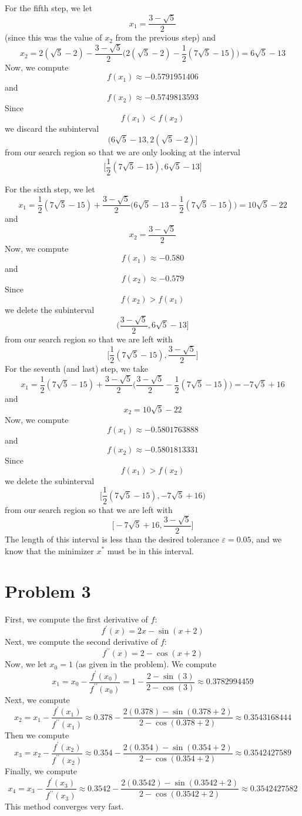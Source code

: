 \documentclass[12pt]{article}
\begin{document}
For the fifth step, we let 
\[
x_1 = \frac{3 - \sqrt{5}}{2}
\] (since this was the value of $x_2$ from the previous step) and
\[
x_2 = 2(\sqrt{5} - 2) - \frac{3 - \sqrt{5}}{2}\bigg(2(\sqrt{5} - 2) - \frac{1}{2}(7\sqrt{5} - 15)\bigg) = 6\sqrt{5} -13
\] Now, we compute 
\[
f(x_1) \approx -0.5791951406
\] and
\[
f(x_2) \approx -0.5749813593
\] Since
\[
f(x_1) < f(x_2)
\] we discard the subinterval 
\[
(6\sqrt{5} - 13, 2(\sqrt{5} - 2)]
\] from our search region so that we are only looking at the interval
\[
\bigg[\frac{1}{2}(7\sqrt{5} - 15), 6\sqrt{5} -13 \bigg]
\]

For the sixth step, we let
\[
x_1 = \frac{1}{2}(7\sqrt{5} - 15) + \frac{3 - \sqrt{5}}{2}\bigg(6\sqrt{5} -13 - \frac{1}{2}(7\sqrt{5} - 15)\bigg) = 10 \sqrt{5} - 22
\] and
\[
x_2 = \frac{3-\sqrt{5}}{2}
\] Now, we compute
\[
f(x_1) \approx -0.580
\] and
\[
f(x_2) \approx -0.579
\] Since
\[
f(x_2) > f(x_1)
\] we delete the subinterval
\[
\bigg( \frac{3-\sqrt{5}}{2}, 6\sqrt{5} - 13\bigg]
\] from our search region so that we are left with
\[
\bigg[\frac{1}{2}(7\sqrt{5} - 15), \frac{3-\sqrt{5}}{2} \bigg]
\] For the seventh (and last) step, we take
\[
x_1 = \frac{1}{2}(7\sqrt{5} - 15) + \frac{3-\sqrt{5}}{2}\bigg(\frac{3-\sqrt{5}}{2} - \frac{1}{2}(7\sqrt{5} - 15)\bigg) = -7\sqrt{5} + 16
\] and 
\[
x_2 = 10 \sqrt{5} - 22
\] Now, we compute 
\[
f(x_1) \approx -0.5801763888
\] and
\[
f(x_2) \approx -0.5801813331
\] Since 
\[
f(x_1) > f(x_2)
\] we delete the subinterval
\[
\bigg[\frac{1}{2}(7\sqrt{5} - 15),  -7\sqrt{5} + 16  \bigg)
\] from our search region so that we are left with
\[
\bigg[-7\sqrt{5} + 16, \frac{3-\sqrt{5}}{2} \bigg]
\] The length of this interval is less than the desired tolerance $\varepsilon = 0.05$, and we know that the minimizer $x^*$ must be in this interval.
\newpage
\section*{Problem 3}
First, we compute the first derivative of $f$:
\[
f^\prime(x) = 2x - \sin(x+2)
\] Next, we compute the second derivative of $f$:
\[
f^{\prime\prime}(x) = 2 - \cos(x+2)
\] Now, we let $x_0 = 1$ (as given in the problem). We compute
\[
x_1 = x_0 - \frac{f^\prime(x_0)}{f^{\prime\prime}(x_0)} = 1 - \frac{2 - \sin(3)}{2 - \cos(3)} \approx 0.3782994459
\] Next, we compute
\[
x_2 = x_1 - \frac{f^\prime(x_1)}{f^{\prime\prime}(x_1)} \approx 0.378 - \frac{2(0.378) - \sin(0.378+2)}{2 - \cos(0.378+2)} \approx 0.3543168444
\] Then we compute
\[
x_3 = x_2 - \frac{f^\prime(x_2)}{f^{\prime\prime}(x_2)} \approx 0.354  - \frac{2(0.354) - \sin(0.354+2)}{2 - \cos(0.354+2)} \approx 0.3542427589
\] Finally, we compute
\[
x_4 = x_3 - \frac{f^\prime(x_3)}{f^{\prime\prime}(x_3)} \approx 0.3542  - \frac{2(0.3542) - \sin(0.3542+2)}{2 - \cos(0.3542+2)} \approx 0.3542427582
\] This method converges very fast.
\end{document}

